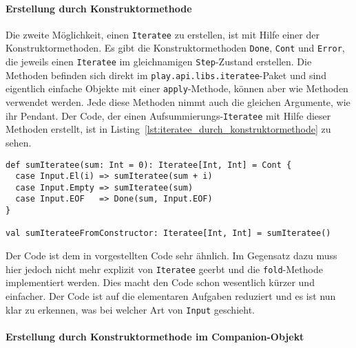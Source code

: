 
\paragraph{Erstellung durch Konstruktormethode} %
\label{par:erstellung_durch_konstruktormethode}\mbox{} %

Die zweite Möglichkeit, einen \lstinline|Iteratee| zu erstellen, ist mit Hilfe einer der Konstruktormethoden.
Es gibt die Konstruktormethoden \lstinline|Done|, \lstinline|Cont| und \lstinline|Error|, die jeweils einen \lstinline|Iteratee| im gleichnamigen \lstinline|Step|-Zustand erstellen.
Die Methoden befinden sich direkt im \lstinline|play.api.libs.iteratee|-Paket und sind eigentlich einfache Objekte mit einer \lstinline|apply|-Methode, können aber wie Methoden verwendet werden.
Jede diese Methoden nimmt auch die gleichen Argumente, wie ihr Pendant.
Der Code, der einen Aufsummierungs-\lstinline|Iteratee| mit Hilfe dieser Methoden erstellt, ist in Listing~\ref{lst:iteratee_durch_konstruktormethode} zu sehen.

\begin{lstlisting}[caption=Erstellung eines Iteratees durch eine Konstruktormethode, label=lst:iteratee_durch_konstruktormethode]
def sumIteratee(sum: Int = 0): Iteratee[Int, Int] = Cont {
  case Input.El(i) => sumIteratee(sum + i)
  case Input.Empty => sumIteratee(sum)
  case Input.EOF   => Done(sum, Input.EOF)
}

val sumIterateeFromConstructor: Iteratee[Int, Int] = sumIteratee()
\end{lstlisting}

Der Code ist dem in  vorgestellten Code sehr ähnlich.
Im Gegensatz dazu muss hier jedoch nicht mehr explizit von \lstinline|Iteratee| geerbt und die \lstinline|fold|-Methode implementiert werden.
Dies macht den Code schon wesentlich kürzer und einfacher.
Der Code ist auf die elementaren Aufgaben reduziert und es ist nun klar zu erkennen, was bei welcher Art von \lstinline|Input| geschieht.


\paragraph{Erstellung durch Konstruktormethode im Companion-Objekt} %
\label{par:erstellung_durch_konstruktormethode_im_companion_objekt}\mbox{} %

